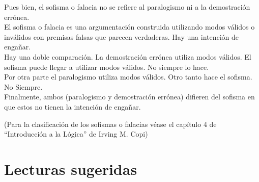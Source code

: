 \documentclass{article}
\begin{document}
Pues bien, el sofisma o falacia no se refiere al paralogismo ni a la demostración errónea. \\
El sofisma o falacia es una argumentación construida utilizando modos válidos o inválidos con premisas falsas que parecen verdaderas. Hay una intención de engañar.
\\
Hay una doble comparación. La demostración errónea utiliza modos válidos. El sofisma puede llegar a utilizar modos válidos. No siempre lo hace.
\\
Por otra parte el paralogismo utiliza modos válidos. Otro tanto hace el sofisma. No Siempre.
\\
Finalmente, ambos (paralogismo y demostración errónea) difieren del sofisma en que estos no tienen la intención de engañar.

\par (Para la clasificación de los sofismas o falacias véase el capítulo 4 de ``Introducción a la Lógica'' de Irving M. Copi)


\newpage
\section{Lecturas sugeridas}


  
\end{document}

